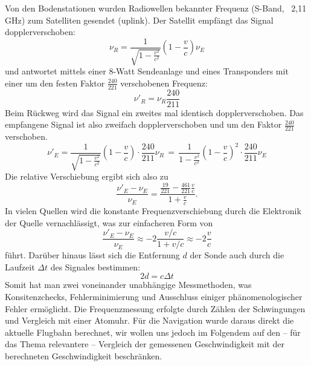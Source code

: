 \documentclass[a4paper,10pt]{article}
\begin{document}
Von den Bodenstationen wurden Radiowellen bekannter Frequenz (S-Band, ~2,11 GHz) zum Satelliten gesendet (uplink).
Der Satellit empfängt das Signal dopplerverschoben:
\begin{equation}
 \nu_R = \frac{1}{\sqrt{1-\frac{v^2}{c^2}}}(1-\frac{v}{c})\nu_E
\end{equation}
und antwortet mittels einer 8-Watt Sendeanlage und eines Transponders
mit einer um den festen Faktor $ \frac{240}{221} $ verschobenen Frequenz:
\begin{equation}
\nu'_R = \nu_R\frac{240}{211}
\end{equation}
Beim Rückweg wird das Signal ein zweites mal identisch dopplerverschoben.
Das empfangene Signal ist also zweifach dopplerverschoben und um den Faktor $\frac{240}{221}$ verschoben.
\begin{equation}
 \nu'_E = \frac{1}{\sqrt{1-\frac{v^2}{c^2}}}(1-\frac{v}{c}) \cdot \frac{240}{211}\nu_R \, = \, \frac{1}{1-\frac{v^2}{c^2}}(1-\frac{v}{c})^2 \cdot \frac{240}{211} \nu_E
\end{equation}
Die relative Verschiebung ergibt sich also zu
\begin{equation}
 \frac{\nu'_E-\nu_E}{\nu_E} = \frac{\frac{19}{221}- \frac{461}{221}\frac{v}{c}}{1+\frac{v}{c}}.
\end{equation}
In vielen Quellen wird die konstante Frequenzverschiebung durch die Elektronik der Quelle vernachlässigt, was zur einfacheren Form von
\begin{equation}
 \frac{\nu'_E-\nu_E}{\nu_E} \approx -2\frac{v/c}{1+v/c} \approx -2 \frac{v}{c}
\end{equation}
führt.
Darüber hinaus lässt sich die Entfernung $d$ der Sonde auch durch die Laufzeit $\Delta t$ des Signales bestimmen:
\begin{equation}
 2d = c \Delta t
\end{equation}
Somit hat man zwei voneinander unabhängige Messmethoden, was Konsitenzchecks,
Fehlerminimierung und Ausschluss einiger phänomenologischer Fehler ermöglicht.
Die Frequenzmessung erfolgte durch Zählen der Schwingungen und Vergleich mit einer Atomuhr.\cite{Nieto2007} %
Für die Navigation wurde daraus direkt die aktuelle Flugbahn berechnet, wir wollen uns jedoch im Folgendem auf den – für das Thema relevantere – 
Vergleich der gemessenen Geschwindigkeit mit der berechneten Geschwindigkeit beschränken. %
\end{document}
